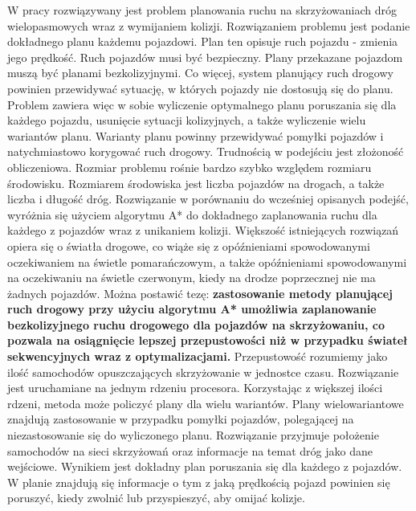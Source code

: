  \label{chap:thesis}

W pracy rozwiązywany jest problem planowania ruchu na skrzyżowaniach dróg wielopasmowych wraz z wymijaniem kolizji. Rozwiązaniem problemu jest podanie dokładnego planu każdemu pojazdowi. Plan ten opisuje ruch pojazdu - zmienia jego prędkość. Ruch pojazdów musi być bezpieczny. Plany przekazane pojazdom muszą być planami bezkolizyjnymi. Co więcej, system planujący ruch drogowy powinien przewidywać sytuację, w których pojazdy nie dostosują się do planu. Problem zawiera więc w sobie wyliczenie optymalnego planu poruszania się dla każdego pojazdu, usunięcie sytuacji kolizyjnych, a także wyliczenie wielu wariantów planu. Warianty planu powinny przewidywać pomyłki pojazdów i natychmiastowo korygować ruch drogowy. Trudnością w podejściu jest złożoność obliczeniowa. Rozmiar problemu rośnie bardzo szybko względem rozmiaru środowisku. Rozmiarem środowiska jest liczba pojazdów na drogach, a także liczba i długość dróg.
\newline
\indent
Rozwiązanie w porównaniu do wcześniej opisanych podejść, wyróżnia się użyciem algorytmu A* do dokładnego zaplanowania ruchu dla każdego z pojazdów wraz z unikaniem kolizji. Większość istniejących rozwiązań opiera się o światła drogowe, co wiąże się z opóźnieniami spowodowanymi oczekiwaniem na świetle pomarańczowym, a także opóźnieniami spowodowanymi na oczekiwaniu na świetle czerwonym, kiedy na drodze poprzecznej nie ma żadnych pojazdów.
\newline
\indent
Można postawić tezę: \textbf{zastosowanie metody planującej ruch drogowy przy użyciu algorytmu A* umożliwia zaplanowanie bezkolizyjnego ruchu drogowego dla pojazdów na skrzyżowaniu, co pozwala na osiągnięcie lepszej przepustowości niż w przypadku świateł sekwencyjnych wraz z optymalizacjami.} Przepustowość rozumiemy jako ilość samochodów opuszczających skrzyżowanie w jednostce czasu. Rozwiązanie jest uruchamiane na jednym rdzeniu procesora. Korzystając z większej ilości rdzeni, metoda może policzyć plany dla wielu wariantów. Plany wielowariantowe znajdują zastosowanie w przypadku pomyłki pojazdów, polegającej na niezastosowanie się do wyliczonego planu.
\newline
\indent
Rozwiązanie przyjmuje położenie samochodów na sieci skrzyżowań oraz informacje na temat dróg jako dane wejściowe. Wynikiem jest dokładny plan poruszania się dla każdego z pojazdów. W planie znajdują się informacje o tym z jaką prędkością pojazd powinien się poruszyć, kiedy zwolnić lub przyspieszyć, aby omijać kolizje.
